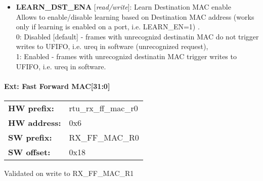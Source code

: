 \begin{itemize}
\begin{small}
\end{small}
\item \begin{small}
{\bf 
LEARN\_DST\_ENA
} [\emph{read/write}]: Learn Destination MAC enable
\\
Allows to enable/disable learning based on Destination MAC address (works only if learning is enabled on a port, i.e. LEARN\_EN=1) .\\                 0: Disabled [default] - frames with unrecognizd destinatin MAC do not trigger writes to UFIFO, i.e. ureq in software (unrecognized request),\\                 1: Enabled  - frames with unrecognizd destinatin MAC trigger writes to UFIFO, i.e. ureq in software.
\end{small}
\end{itemize}
\paragraph*{Ext: Fast Forward MAC[31:0]}\vspace{12pt}

\begin{tabular}{l l }
{\bf HW prefix:}  & rtu\_rx\_ff\_mac\_r0\\
{\bf HW address:}  & 0x6\\
{\bf SW prefix:}  & RX\_FF\_MAC\_R0\\
{\bf SW offset:}  & 0x18\\
\end{tabular}

\vspace{12pt}
Validated on write to RX\_FF\_MAC\_R1

\vspace{12pt}
\noindent
{}

